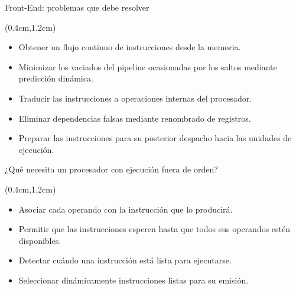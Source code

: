 \begin{frame}{Front-End: problemas que debe resolver}
 \begin{textblock*}{\textwidth}(0.4cm,1.2cm)
  \begin{tcolorbox}[enhanced jigsaw,rounded corners,drop fuzzy shadow=ShadowColor]
   \begin{itemize}[<+->]\justifying
    \item Obtener un flujo continuo de instrucciones desde la memoria.
    \item Minimizar los vaciados del pipeline ocasionadas por los saltos mediante predicción dinámica.
    \item Traducir las instrucciones a operaciones internas del procesador.
    \item Eliminar dependencias falsas mediante renombrado de registros.
    \item Preparar las instrucciones para su posterior despacho hacia las unidades de ejecución.
   \end{itemize}
  \end{tcolorbox}
 \end{textblock*}
\end{frame}

\begin{frame}{¿Qué necesita un procesador con ejecución fuera de orden?}
 \begin{textblock*}{\textwidth}(0.4cm,1.2cm)
  \begin{tcolorbox}[enhanced jigsaw,rounded corners,drop fuzzy shadow=ShadowColor]
   \begin{itemize}[<+->]\justifying
    \item Asociar cada operando con la instrucción que lo producirá.
    \item Permitir que las instrucciones esperen hasta que todos sus operandos estén disponibles.
    \item Detectar cuándo una instrucción está lista para ejecutarse.
    \item Seleccionar dinámicamente instrucciones listas para su emisión.
   \end{itemize}
  \end{tcolorbox}
 \end{textblock*}
\end{frame}

